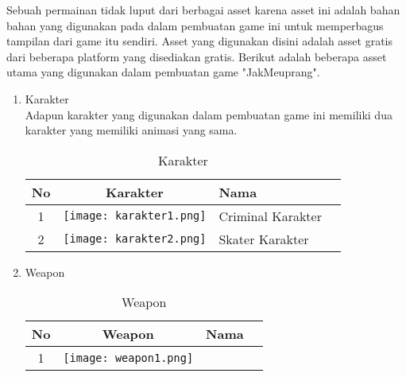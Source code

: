 Sebuah permainan tidak luput dari berbagai asset karena asset ini adalah bahan bahan yang digunakan pada dalam pembuatan game ini untuk memperbagus tampilan dari game itu sendiri. Asset yang digunakan disini adalah asset gratis dari beberapa platform yang disediakan gratis. Berikut adalah beberapa asset utama yang digunakan dalam pembuatan game "JakMeuprang".
\newpage
\begin{enumerate}
    \item Karakter \\
    Adapun karakter yang digunakan dalam pembuatan game ini memiliki dua karakter yang memiliki animasi yang sama.
    \begin{table}[h!]
        \centering
        \caption{Karakter}\label{tbl:karakter}
        \begin{tabular}{ | c | c | m{6cm} | m{6cm} | }
            \hline
            No & Karakter & Nama \\ \hline
            1 &
            \begin{minipage}{.2\textwidth}
                \texttt{[image: karakter1.png]}
            \end{minipage}
            &
            \begin{minipage}{6cm}
                Criminal Karakter
            \end{minipage}
            \\ \hline
            2 &
        \begin{minipage}{.2\textwidth}
            \texttt{[image: karakter2.png]}
        \end{minipage}
        &
        \begin{minipage}{6cm}
            Skater Karakter
        \end{minipage}
        \\ \hline
        \end{tabular}
    \end{table}
    \newpage
    \item Weapon \\
    \begin{table}[h!]
        \centering
        \caption{Weapon}\label{tbl:weapon}
        \begin{tabular}{ | c | c | m{6cm} | m{6cm} | }
            \hline
            No & Weapon & Nama \\ \hline
            1 &
            \begin{minipage}{.2\textwidth}
                \texttt{[image: weapon1.png]}

\end{minipage}
\end{tabular}
\end{table}
\end{enumerate}

